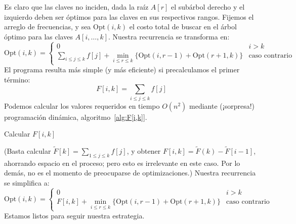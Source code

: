   Es claro que las claves no inciden,
  dada la raíz \(A[r]\)
  el subárbol derecho y el izquierdo deben ser óptimos para las claves
  en sus respectivos rangos.
  Fijemos el arreglo de frecuencias,
  y sea \(\mathrm{Opt}(i, k)\) el costo total
  de buscar en el árbol óptimo para las claves \(A[i, \dotsc, k]\).
  Nuestra recurrencia se transforma en:
  \begin{equation*}
    \mathrm{Opt}(i, k)
      = \begin{cases}
	   0  & i > k \\
	   \sum_{i \le j \le k} f[j]
	      + \min_{i \le r \le k} \{ \mathrm{Opt}(i, r - 1)
					   + \mathrm{Opt}(r + 1, k) \}
	      & \text{caso contrario}
	 \end{cases}
  \end{equation*}
  El programa resulta más simple
  (y más eficiente)
  si precalculamos el primer término:
  \begin{equation*}
    F[i, k]
      = \sum_{i \le j \le k} f[j]
  \end{equation*}
  Podemos calcular los valores requeridos en tiempo \(O(n^2)\) mediante
  (¡sorpresa!)
  programación dinámica,
  algoritmo~\ref{alg:F[i,k]}.
  \begin{algorithm}
    \DontPrintSemicolon\Indp

    \caption{Calcular \(F[i, k]\)}
    \label{alg:F[i,k]}
  \end{algorithm}
  (Basta calcular \(\tilde{F}[k] = \sum_{1 \le j \le k} f[j]\),
   y obtener \(F[i, k] = \tilde{F}(k) - \tilde{F}[i - 1]\),
   ahorrando espacio en el proceso;
   pero esto es irrelevante en este caso.
   Por lo demás,
   no es el momento de preocuparse de optimizaciones.)
   Nuestra recurrencia se simplifica a:
  \begin{equation*}
    \mathrm{Opt}(i, k)
      = \begin{cases}
	   0  & i > k \\
	   F[i, k]
	      + \min_{i \le r \le k} \{ \mathrm{Opt}(i, r - 1)
					   + \mathrm{Opt}(r + 1, k) \}
	      & \text{caso contrario}
	 \end{cases}
  \end{equation*}
  Estamos listos para seguir nuestra estrategia.
